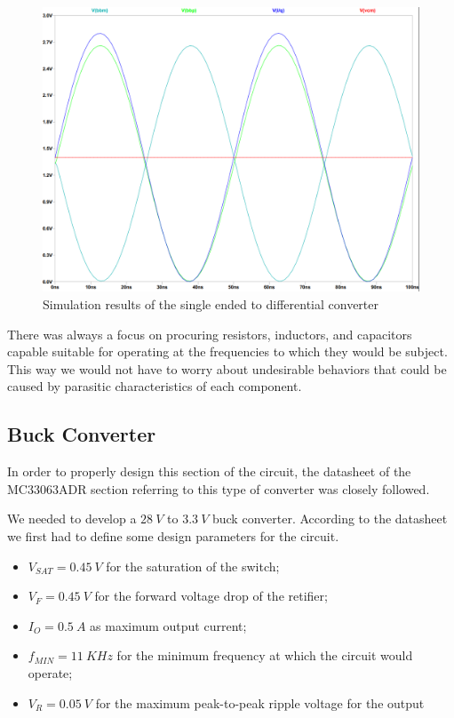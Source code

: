 \begin{figure}[H]
    \vspace*{0cm}
    \centering
    \includegraphics[width=0.7\linewidth]{figs/ch3_LTC5589interfacePlot.png}
    \caption{Simulation results of the single ended to differential converter}
    \label{fig:ch3_LTC5589interfacePlot}
\end{figure}

\par There was always a focus on procuring resistors, inductors, and capacitors capable suitable for operating at the frequencies to which they would be subject. This way we would not have to worry about undesirable behaviors that could be caused by parasitic characteristics of each component.

\subsection{Buck Converter}
\par In order to properly design this section of the circuit, the datasheet of the MC33063ADR section referring to this type of converter was closely followed.

\par We needed to develop a $28\:\si{V}$ to $3.3\:\si{V}$ buck converter. According to the datasheet we first had to define some design parameters for the circuit. 

\begin{itemize}
    \item $V_{SAT} = 0.45\:\si{V}$ for the saturation of the switch;
    \item $V_{F} = 0.45\:\si{V}$ for the forward voltage drop of the retifier;
    \item $I_{O} = 0.5\:\si{A}$ as maximum output current;
    \item $f_{MIN} = 11\:\si{KHz}$ for the minimum frequency at which the circuit would operate;
    \item $V_{R} = 0.05\:\si{V}$ for the maximum peak-to-peak ripple voltage for the output
\end{itemize}

